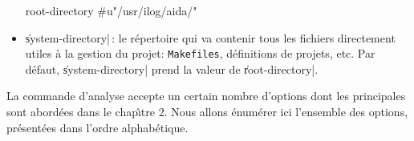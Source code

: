 \begin{itemize}
\begin{Code*}
root-directory #u"/usr/ilog/aida/"
\end{Code*}

\item {\Large \|system-directory|}\,: le r\'{e}pertoire qui va contenir
tous les fichiers directement utiles \`{a} la gestion du projet:
{\tt Makefiles}, d\'{e}finitions de projets, etc. Par d\'{e}faut,
\|system-directory| prend la valeur de \|root-directory|.

\end{itemize}

La commande d'analyse accepte un certain nombre d'options dont les
principales sont abord\'{e}es dans le chap\^{\i}tre 2. Nous allons \'{e}num\'{e}rer
ici l'ensemble des options, pr\'{e}sent\'{e}es dans l'ordre alphab\'{e}tique.

